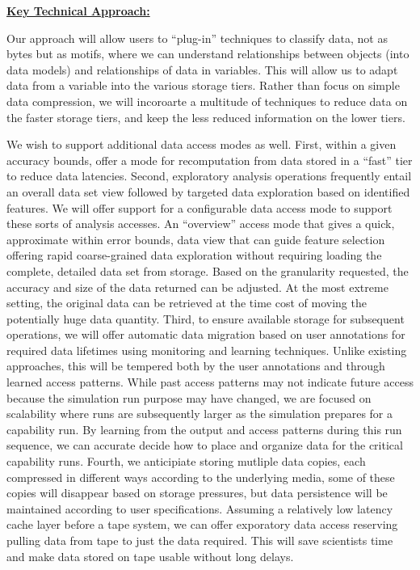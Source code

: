 \documentclass[11pt,letterpaper]{article}
\begin{document}
\underline{\textbf{Key Technical Approach:}}

Our approach will allow users to ``plug-in'' techniques to classify data, not as bytes but as motifs, where
we can understand relationships between objects (into data models) and relationships of data in variables.
This will allow us to adapt data from a variable into the various storage tiers. Rather than focus on simple data
compression, we will incoroarte a multitude of techniques to reduce data on the faster storage tiers, and keep the less
reduced information on the lower tiers.

We wish to support additional data access modes as well. First, within a given
accuracy bounds, offer a mode for recomputation from data stored in a ``fast''
tier to reduce data latencies. Second, exploratory analysis operations
frequently entail an overall data set view followed by targeted data
exploration based on identified features. We will offer support for a
configurable data access mode to support these sorts of analysis accesses. An
``overview'' access mode that gives a quick, approximate within error bounds,
data view that can guide feature selection offering rapid coarse-grained data
exploration without requiring loading the complete, detailed data set from
storage. Based on the granularity requested, the accuracy and size of the data
returned can be adjusted. At the most extreme setting, the original data can
be retrieved at the time cost of moving the potentially huge data quantity.
Third, to ensure available storage for subsequent operations, we will offer
automatic data migration based on user annotations for required data lifetimes
using monitoring and learning techniques. Unlike existing approaches, this will
be tempered both by the user annotations and through learned access patterns.
While past access patterns may not indicate future access because the
simulation run purpose may have changed, we are focused on scalability where
runs are subsequently larger as the simulation prepares for a capability run.
By learning from the output and access patterns during this run sequence, we
can accurate decide how to place and organize data for the critical capability
runs. Fourth, we anticipiate storing mutliple data copies, each compressed in
different ways according to the underlying media, some of these copies will
disappear based on storage pressures, but data persistence will be maintained
according to user specifications. Assuming a relatively low latency cache layer
before a tape system, we can offer exporatory data access reserving pulling
data from tape to just the data required. This will save scientists time and
make data stored on tape usable without long delays.
\end{document}

